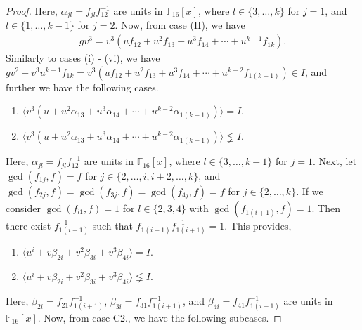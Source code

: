\documentclass{amsart}
\theoremstyle{definition}
\theoremstyle{remark}
\numberwithin{equation}{section}
\begin{document}
\begin{proof}
        Here, $\alpha_{jl} = f_{jl}f_{12}^{-1}$ are units in $\mathbb{F}_{16}[x]$, where $l \in \{3,\dots,k\}$ for $j = 1$, and $l \in \{1,\dots,k-1\}$ for $j = 2$. Now, from case (II), we have  
        \begin{align*}
        gv^3 = v^3(uf_{12} + u^2f_{13} + u^3f_{14} + \cdots + u^{k-1}f_{1k}).   
        \end{align*}
        Similarly to cases (i) - (vi), we have $gv^2 - v^3u^{k-1}f_{1k} =  v^3(uf_{12} + u^2f_{13} + u^3f_{14} + \cdots + u^{k-2}f_{1(k-1)}) \in I$, and further we have the following cases.
        
       \begin{enumerate}
        \item [(vii)] $  \langle v^3(u + u^2\alpha_{13} + u^3\alpha_{14} + \cdots + u^{k-2}\alpha_{1(k-1)})\rangle = I $.
        \item [(viii)] $  \langle v^3(u + u^2\alpha_{13} + u^3\alpha_{14} + \cdots + u^{k-2}\alpha_{1(k-1)})\rangle \lneqq I $.
        \end{enumerate}
       
        Here, $\alpha_{jl} = f_{jl}f_{12}^{-1}$ are units in $\mathbb{F}_{16}[x]$, where $l \in \{3,\dots,k-1\}$ for $j = 1$. Next, let $\gcd(f_{1j}, f ) = f$ for $j \in \{2,\dots,i,i+2,\dots,k\}$, and $\gcd(f_{2j},f) = \gcd(f_{3j},f) = \gcd(f_{4j},f) = f $ for $j \in \{2,\dots,k\}$. If we consider $\gcd(f_{l1}, f) = 1 $ for $l \in \{2,3,4\}$ with $ \gcd(f_{1(i+1)},f) = 1$. Then there exist $f_{1(i+1)}^{-1}$ such that $f_{1(i+1)}f_{1(i+1)}^{-1} = 1$. This provides,
    
        \begin{enumerate}
            \item [C1.] $ \langle u^i + v\beta_{2i} + v^2\beta_{3i} + v^3\beta_{4i}\rangle = I$.
            \item [C2.] $ \langle u^i + v\beta_{2i} + v^2\beta_{3i} + v^3\beta_{4i}\rangle \lneqq I $.
        \end{enumerate}
        
        Here, $\beta_{2i} = f_{21}f_{1(i+1)}^{-1}$, $\beta_{3i} = f_{31}f_{1(i+1)}^{-1}$, and $\beta_{4i} = f_{41}f_{1(i+1)}^{-1}$ are units in $\mathbb{F}_{16}[x]$. Now, from case C2., we have the following subcases.
        

\end{proof}
\end{document}
